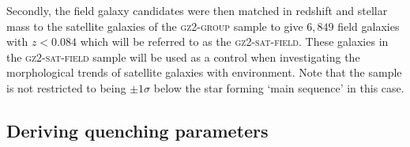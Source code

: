 \documentclass[useAMS,usenatbib]{mn2e}
\begin{document}
Secondly, the field galaxy candidates were then matched in redshift and stellar mass to the satellite galaxies of the \textsc{gz2-group} sample to give $6,849$ field galaxies with $z < 0.084$ which will be referred to as the \textsc{gz2-sat-field}. These galaxies in the \textsc{gz2-sat-field} sample will be used as a control when investigating the morphological trends of satellite galaxies with environment. Note that the sample is not restricted to being $\pm1\sigma$ below the star forming `main sequence' in this case. %

  

\begin{figure}
\label{fig:zcompare}
\end{figure}

\subsection{Deriving quenching parameters}\label{sec:starpy}
\end{document}
